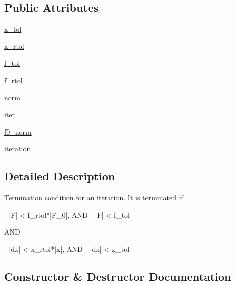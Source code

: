 \subsection*{Public Attributes}
\begin{DoxyCompactItemize}
\item 
\hyperlink{classscipy_1_1optimize_1_1nonlin_1_1TerminationCondition_a23fec28772d6960641393d55310cbb5d}{x\+\_\+tol}
\item 
\hyperlink{classscipy_1_1optimize_1_1nonlin_1_1TerminationCondition_a9ae7ab04dfb741aff08ca35f193a434c}{x\+\_\+rtol}
\item 
\hyperlink{classscipy_1_1optimize_1_1nonlin_1_1TerminationCondition_a862a7396d3e7dce842409848356e3979}{f\+\_\+tol}
\item 
\hyperlink{classscipy_1_1optimize_1_1nonlin_1_1TerminationCondition_aececcaebd247df8b710aeeb88ed29ced}{f\+\_\+rtol}
\item 
\hyperlink{classscipy_1_1optimize_1_1nonlin_1_1TerminationCondition_a2124928dd442868ceae99e70ebeeb37c}{norm}
\item 
\hyperlink{classscipy_1_1optimize_1_1nonlin_1_1TerminationCondition_aaa1fe471df85a327e88c212b83b6f518}{iter}
\item 
\hyperlink{classscipy_1_1optimize_1_1nonlin_1_1TerminationCondition_a46ddf00576dcebe4c6e214a7961cd4c0}{f0\+\_\+norm}
\item 
\hyperlink{classscipy_1_1optimize_1_1nonlin_1_1TerminationCondition_a1d53fb62538a12b037569abc7a443bd7}{iteration}
\end{DoxyCompactItemize}


\subsection{Detailed Description}
\begin{DoxyVerb}Termination condition for an iteration. It is terminated if

- |F| < f_rtol*|F_0|, AND
- |F| < f_tol

AND

- |dx| < x_rtol*|x|, AND
- |dx| < x_tol\end{DoxyVerb}
 

\subsection{Constructor \& Destructor Documentation}
\hypertarget{classscipy_1_1optimize_1_1nonlin_1_1TerminationCondition_a965056b946098c0d4b5515cc40b35792}{}

